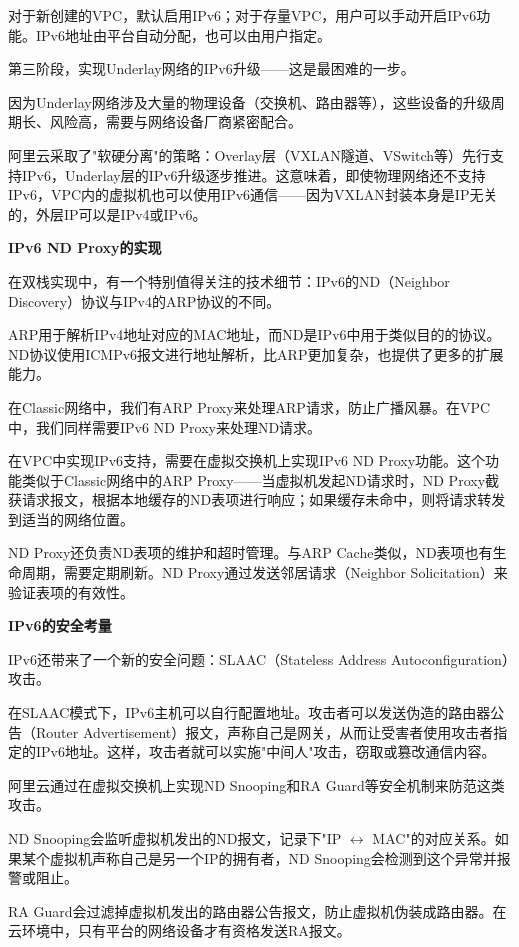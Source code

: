 对于新创建的VPC，默认启用IPv6；对于存量VPC，用户可以手动开启IPv6功能。IPv6地址由平台自动分配，也可以由用户指定。

第三阶段，实现Underlay网络的IPv6升级——这是最困难的一步。

因为Underlay网络涉及大量的物理设备（交换机、路由器等），这些设备的升级周期长、风险高，需要与网络设备厂商紧密配合。

阿里云采取了"软硬分离"的策略：Overlay层（VXLAN隧道、VSwitch等）先行支持IPv6，Underlay层的IPv6升级逐步推进。这意味着，即使物理网络还不支持IPv6，VPC内的虚拟机也可以使用IPv6通信——因为VXLAN封装本身是IP无关的，外层IP可以是IPv4或IPv6。

\textbf{IPv6 ND Proxy的实现}

在双栈实现中，有一个特别值得关注的技术细节：IPv6的ND（Neighbor Discovery）协议与IPv4的ARP协议的不同。

ARP用于解析IPv4地址对应的MAC地址，而ND是IPv6中用于类似目的的协议。ND协议使用ICMPv6报文进行地址解析，比ARP更加复杂，也提供了更多的扩展能力。

在Classic网络中，我们有ARP Proxy来处理ARP请求，防止广播风暴。在VPC中，我们同样需要IPv6 ND Proxy来处理ND请求。

在VPC中实现IPv6支持，需要在虚拟交换机上实现IPv6 ND Proxy功能。这个功能类似于Classic网络中的ARP Proxy——当虚拟机发起ND请求时，ND Proxy截获请求报文，根据本地缓存的ND表项进行响应；如果缓存未命中，则将请求转发到适当的网络位置。

ND Proxy还负责ND表项的维护和超时管理。与ARP Cache类似，ND表项也有生命周期，需要定期刷新。ND Proxy通过发送邻居请求（Neighbor Solicitation）来验证表项的有效性。

\textbf{IPv6的安全考量}

IPv6还带来了一个新的安全问题：SLAAC（Stateless Address Autoconfiguration）攻击。

在SLAAC模式下，IPv6主机可以自行配置地址。攻击者可以发送伪造的路由器公告（Router Advertisement）报文，声称自己是网关，从而让受害者使用攻击者指定的IPv6地址。这样，攻击者就可以实施"中间人"攻击，窃取或篡改通信内容。

阿里云通过在虚拟交换机上实现ND Snooping和RA Guard等安全机制来防范这类攻击。

ND Snooping会监听虚拟机发出的ND报文，记录下"IP $\leftrightarrow$ MAC"的对应关系。如果某个虚拟机声称自己是另一个IP的拥有者，ND Snooping会检测到这个异常并报警或阻止。

RA Guard会过滤掉虚拟机发出的路由器公告报文，防止虚拟机伪装成路由器。在云环境中，只有平台的网络设备才有资格发送RA报文。

